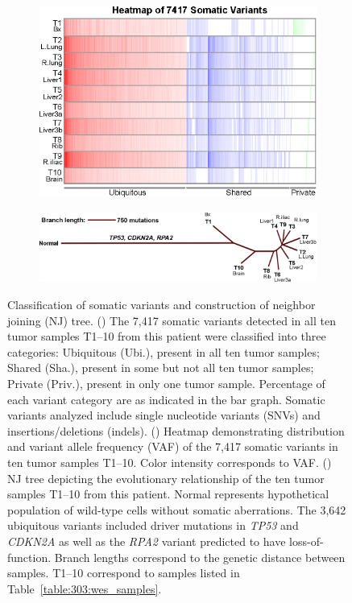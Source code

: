 \begin{figure}[htbp]
\begin{subfigure}{0.23\textwidth}
		\caption{}\label{fig:303:variants_by_category}
	\end{subfigure}%
	\hfill%
	\begin{subfigure}{0.72\textwidth}
		\includegraphics[width=\textwidth,keepaspectratio]{images/303/mutation_heatmap}
		\caption{}\label{fig:303:mutation_heatmap}
	\end{subfigure}\par\vspace{0.3cm}
	\begin{subfigure}{0.9\textwidth}
	    \includegraphics[width=\textwidth,keepaspectratio]{images/303/nj_tree}
	    \caption{}\label{fig:303:nj_tree}
	\end{subfigure}
	\caption[Classification of somatic variants and NJ tree.]{Classification of somatic variants and construction of neighbor joining (NJ) tree. () The 7,417 somatic variants detected in all ten tumor samples T1--10 from this patient were classified into three categories: Ubiquitous (Ubi.), present in all ten tumor samples; Shared (Sha.), present in some but not all ten tumor samples; Private (Priv.), present in only one tumor sample. Percentage of each variant category are as indicated in the bar graph. Somatic variants analyzed include single nucleotide variants (SNVs) and insertions/deletions (indels). () Heatmap demonstrating distribution and variant allele frequency (VAF) of the 7,417 somatic variants in ten tumor samples T1--10. Color intensity corresponds to VAF\@. () NJ tree depicting the evolutionary relationship of the ten tumor samples T1--10 from this patient. Normal represents hypothetical population of wild-type cells without somatic aberrations. The 3,642 ubiquitous variants included driver mutations in \textit{TP53} and \textit{CDKN2A} as well as the \textit{RPA2} variant predicted to have loss-of-function. Branch lengths correspond to the genetic distance between samples. T1--10 correspond to samples listed in Table~\ref{table:303:wes_samples}.}

\end{figure}
